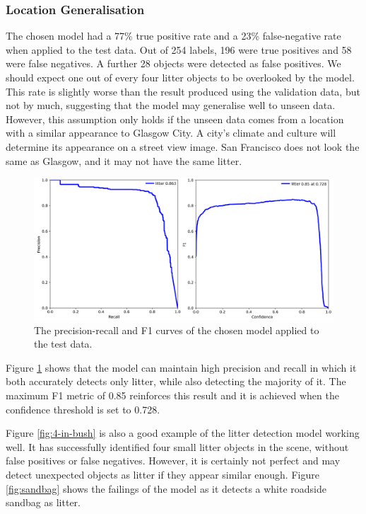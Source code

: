 \documentclass{thesis}
\begin{document}
\subsubsection{Location Generalisation}

The chosen model had a 77\% true positive rate and a 23\% false-negative rate when applied to the test data. Out of 254 labels, 196 were true positives and 58 were false negatives. A further 28 objects were detected as false positives. We should expect one out of every four litter objects to be overlooked by the model. This rate is slightly worse than the result produced using the validation data, but not by much, suggesting that the model may generalise well to unseen data. However, this assumption only holds if the unseen data comes from a location with a similar appearance to Glasgow City. A city's climate and culture will determine its appearance on a street view image. San Francisco does not look the same as Glasgow, and it may not have the same litter.

\begin{figure}[h!]
    \centering
    \includegraphics[scale=0.3]{images/fm-prf1-curves.png}
    \caption{The precision-recall and F1 curves of the chosen model applied to the test data.}
    \label{fig:fm-prf1-curve}
\end{figure}

Figure \ref{fig:fm-prf1-curve} shows that the model can maintain high precision and recall in which it both accurately detects only litter, while also detecting the majority of it. The maximum F1 metric of 0.85 reinforces this result and it is achieved when the confidence threshold is set to 0.728.

Figure \ref{fig:4-in-bush} is also a good example of the litter detection model working well. It has successfully identified four small litter objects in the scene, without false positives or false negatives. However, it is certainly not perfect and may detect unexpected objects as litter if they appear similar enough. Figure \ref{fig:sandbag} shows the failings of the model as it detects a white roadside sandbag as litter.
\end{document}
